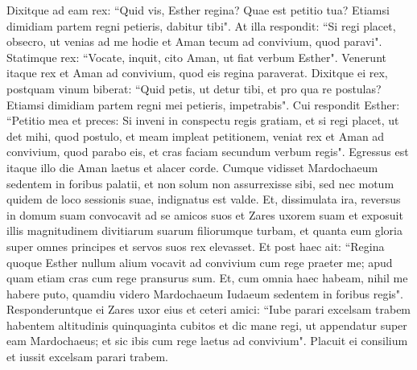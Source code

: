 \begin{biblechapter}
\verse Dixitque ad eam rex: “Quid vis, Esther regina? Quae est petitio tua? Etiamsi dimidiam partem regni petieris, dabitur tibi". 
\verse At illa respondit: “Si regi placet, obsecro, ut venias ad me hodie et Aman tecum ad convivium, quod paravi". 
\verse Statimque rex: “Vocate, inquit, cito Aman, ut fiat verbum Esther". Venerunt itaque rex et Aman ad convivium, quod eis regina paraverat. 
\verse Dixitque ei rex, postquam vinum biberat: “Quid petis, ut detur tibi, et pro qua re postulas? Etiamsi dimidiam partem regni mei petieris, impetrabis". 
\verse Cui respondit Esther: “Petitio mea et preces: 
\verse Si inveni in conspectu regis gratiam, et si regi placet, ut det mihi, quod postulo, et meam impleat petitionem, veniat rex et Aman ad convivium, quod parabo eis, et cras faciam secundum verbum regis". 
\verse Egressus est itaque illo die Aman laetus et alacer corde. Cumque vidisset Mardochaeum sedentem in foribus palatii, et non solum non assurrexisse sibi, sed nec motum quidem de loco sessionis suae, indignatus est valde. 
\verse Et, dissimulata ira, reversus in domum suam convocavit ad se amicos suos et Zares uxorem suam 
\verse et exposuit illis magnitudinem divitiarum suarum filiorumque turbam, et quanta eum gloria super omnes principes et servos suos rex elevasset. 
\verse Et post haec ait: “Regina quoque Esther nullum alium vocavit ad convivium cum rege praeter me; apud quam etiam cras cum rege pransurus sum.  
\verse Et, cum omnia haec habeam, nihil me habere puto, quamdiu videro Mardochaeum Iudaeum sedentem in foribus regis". 
\verse Responderuntque ei Zares uxor eius et ceteri amici: “Iube parari excelsam trabem habentem altitudinis quinquaginta cubitos et dic mane regi, ut appendatur super eam Mardochaeus; et sic ibis cum rege laetus ad convivium". Placuit ei consilium et iussit excelsam parari trabem. 
\end{biblechapter}

